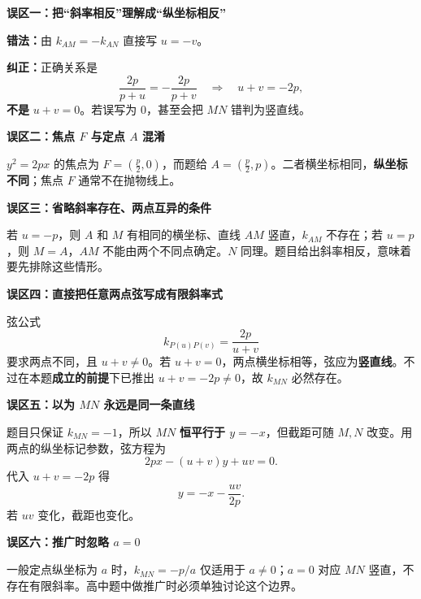 \clearpage
\begin{trapbox}
\textbf{误区一：把“斜率相反”理解成“纵坐标相反”}
\begin{center}\end{center}


\textbf{错法：}由 $k_{AM}=-k_{AN}$ 直接写 $u=-v$。

\textbf{纠正：}正确关系是
\[
 \frac{2p}{p+u}=-\frac{2p}{p+v}
 \quad\Longrightarrow\quad \boxed{u+v=-2p},
\]
\textbf{不是} $u+v=0$。若误写为 $0$，甚至会把 $MN$ 错判为竖直线。

\medskip
\textbf{误区二：焦点 $F$ 与定点 $A$ 混淆}

$y^2=2px$ 的焦点为 $F=(\frac p2,0)$，而题给 $A=(\frac p2,p)$。二者横坐标相同，\textbf{纵坐标不同}；焦点 $F$ 通常不在抛物线上。

\medskip
\textbf{误区三：省略斜率存在、两点互异的条件}

若 $u=-p$，则 $A$ 和 $M$ 有相同的横坐标、直线 $AM$ 竖直，$k_{AM}$ 不存在；若 $u=p$，则 $M=A$，$AM$ 不能由两个不同点确定。$N$ 同理。题目给出斜率相反，意味着要先排除这些情形。
\end{trapbox}

\clearpage
\begin{trapbox}
\textbf{误区四：直接把任意两点弦写成有限斜率式}

弦公式
\[
 \boxed{k_{P(u)P(v)}=\frac{2p}{u+v}}
\]
要求两点不同，且 $u+v\ne0$。若 $u+v=0$，两点横坐标相等，弦应为\textbf{竖直线}。不过在本题\textbf{成立的前提}下已推出 $u+v=-2p\ne0$，故 $k_{MN}$ 必然存在。

\medskip
\textbf{误区五：以为 $MN$ 永远是同一条直线}
\begin{center}\end{center}


题目只保证 $k_{MN}=-1$，所以 $MN$ \textbf{恒平行于 $y=-x$}，但截距可随 $M,N$ 改变。用两点的纵坐标记参数，弦方程为
\[
 2px-(u+v)y+uv=0.
\]
代入 $u+v=-2p$ 得
\[
 \boxed{y=-x-\frac{uv}{2p}}.
\]
若 $uv$ 变化，截距也变化。

\medskip
\textbf{误区六：推广时忽略 $a=0$}

一般定点纵坐标为 $a$ 时，$k_{MN}=-p/a$ 仅适用于 $a\ne0$；$a=0$ 对应 $MN$ 竖直，不存在有限斜率。高中题中做推广时必须单独讨论这个边界。
\end{trapbox}
